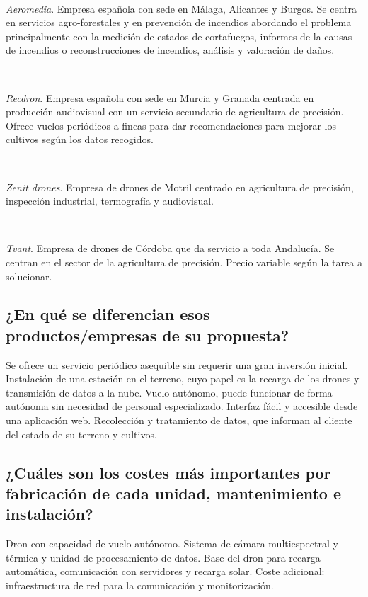 \documentclass[11pt,spanish]{article} %
\begin{document}
\

\textit{Aeromedia}. Empresa española con sede en Málaga, Alicantes y Burgos. Se centra en servicios agro-forestales y en prevención de incendios abordando el problema principalmente con la medición de estados de cortafuegos, informes de la causas de incendios o reconstrucciones de incendios, análisis y valoración de daños.

\

\textit{Recdron}. Empresa española con sede en Murcia y Granada centrada en producción audiovisual con un servicio secundario de agricultura de precisión. Ofrece vuelos periódicos a fincas para dar recomendaciones para mejorar los cultivos según los datos recogidos.  

\

\textit{Zenit drones}. Empresa de drones de Motril centrado en agricultura de precisión, inspección industrial, termografía y audiovisual.

\

\textit{Tvant}. Empresa de drones de Córdoba que da servicio a toda Andalucía. Se centran en el sector de la agricultura de precisión. Precio variable según la tarea a solucionar.

\subsection{¿En qué se diferencian esos productos/empresas de su propuesta?}
Se ofrece un servicio periódico asequible sin requerir una gran inversión inicial. 
Instalación de una estación en el terreno, cuyo papel es la recarga de los drones y transmisión de datos a la nube.
Vuelo autónomo, puede funcionar de forma autónoma sin necesidad de personal especializado.
Interfaz fácil y accesible desde una aplicación web.
Recolección y tratamiento de datos, que informan al cliente del estado de su terreno y cultivos.

\subsection{¿Cuáles son los costes más importantes por fabricación de cada unidad, mantenimiento e instalación?}

Dron con capacidad de vuelo autónomo.
Sistema de cámara multiespectral y térmica y unidad de procesamiento de datos.
Base del dron para recarga automática, comunicación con servidores y recarga solar.
Coste adicional: infraestructura de red para la comunicación y monitorización.
\end{document}
